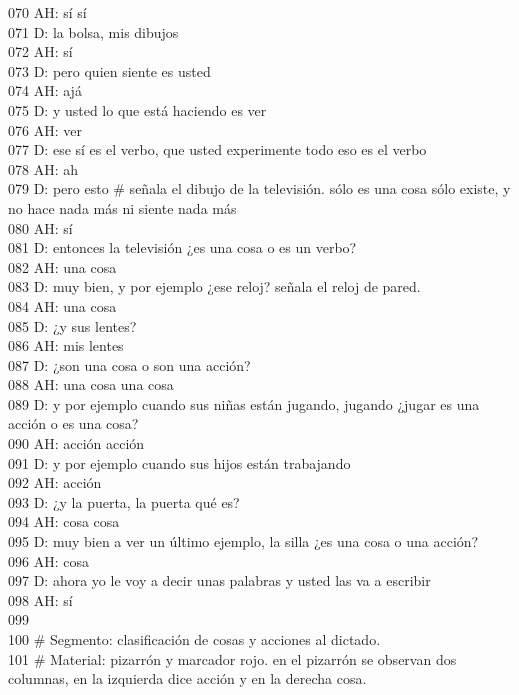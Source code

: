 070 AH: sí sí\\
071 D: la bolsa, mis dibujos\\
072 AH: sí\\
073 D: pero quien siente es usted\\
074 AH: ajá\\
075 D: y usted lo que está haciendo es ver\\
076 AH: ver\\
077 D: ese sí es el verbo, que usted experimente todo eso es el verbo\\
078 AH: ah\\
079 D: pero esto \# señala el dibujo de la televisión. sólo es una cosa sólo existe, y no hace nada más ni siente nada más\\
080 AH: sí\\
081 D: entonces la televisión ¿es una cosa o es un verbo?\\
082 AH: una cosa\\
083 D: muy bien, y por ejemplo ¿ese reloj?  señala el reloj de pared.\\
084 AH: una cosa\\
085 D: ¿y sus lentes?\\
086 AH: mis lentes\\
087 D: ¿son una cosa o son una acción?\\
088 AH: una cosa una cosa\\
089 D: y por ejemplo cuando sus niñas están jugando, jugando ¿jugar es una acción o es una cosa?\\
090 AH: acción acción\\
091 D: y por ejemplo cuando sus hijos están trabajando\\
092 AH: acción\\
093 D: ¿y la puerta, la puerta qué es?\\
094 AH: cosa cosa\\
095 D: muy bien a ver un último ejemplo, la silla ¿es una cosa o una acción?\\
096 AH: cosa\\
097 D: ahora yo le voy a decir unas palabras y usted las va a escribir\\
098 AH: sí\\
099 \\
100 \# Segmento: clasificación de cosas y acciones al dictado.\\
101 \# Material: pizarrón y marcador rojo. en el pizarrón se observan dos columnas, en la izquierda dice acción y en la derecha cosa.\\
